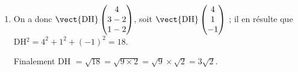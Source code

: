 \begin{enumerate}
\begin{enumerate}
Or (DH) $\perp \Delta \Rightarrow \delta \cdot \vect{\text{DH}} = 0 \iff 0 + 3 + t + 1 + t = 0 \iff 4 + 2t = 0 \iff 2t = - 4 \iff t = - 2$.

On a donc H$(0~;~0~;~- 3) \in \Delta$.
		\item 
On a donc $\vect{\text{DH}}\begin{pmatrix}4\\3 - 2\\1 - 2\end{pmatrix}$, soit $\vect{\text{DH}}\begin{pmatrix}4\\1\\- 1\end{pmatrix}$ ; il en résulte que DH$^2 = 4^2 +1^2 + (- 1)^2 = 18$.
		
Finalement DH $= \sqrt{18} = \sqrt{9 \times 2} = \sqrt 9 \times \sqrt 2 = 3\sqrt 2$.
	\end{enumerate}
\end{enumerate}


\bigskip
